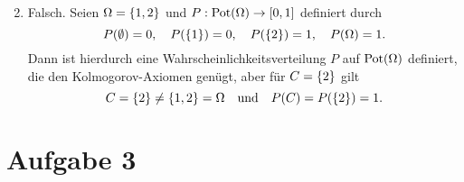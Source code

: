 \documentclass{exercise}
\begin{document}
\begin{enumerate}
\[        \]
        \item Falsch.
        Seien \(\Omega = \braces*{1, 2}\) und \(P: \Pot\parentheses*{\Omega} \to \brackets*{0, 1}\) definiert durch
        \[
            P\parentheses*{\emptyset} = 0, \quad P\parentheses*{\braces*{1}} = 0, \quad P\parentheses*{\braces*{2}} = 1, \quad P\parentheses*{\Omega} = 1.
        \]
        Dann ist hierdurch eine Wahrscheinlichkeitsverteilung \(P\) auf \(\Pot\parentheses*{\Omega}\) definiert, die den Kolmogorov-Axiomen genügt, aber für \(C = \braces*{2}\) gilt
        \[
            C = \braces*{2} \ne \braces*{1, 2} = \Omega \quad \text{und} \quad P\parentheses*{C} = P\parentheses*{\braces*{2}} = 1.
        \]
    \end{enumerate}


    \section*{Aufgabe 3}
\end{document}
